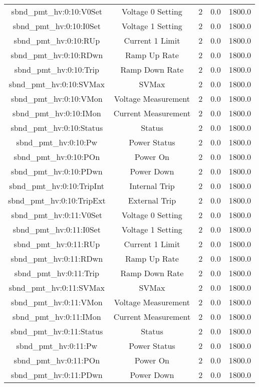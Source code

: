 \begin{center}
\begin{longtable}{c | c c c c }
sbnd\_pmt\_hv:0:10:V0Set & Voltage 0 Setting & 2 & 0.0 & 1800.0\\ 
sbnd\_pmt\_hv:0:10:I0Set & Voltage 1 Setting & 2 & 0.0 & 1800.0\\ 
sbnd\_pmt\_hv:0:10:RUp & Current 1 Limit & 2 & 0.0 & 1800.0\\ 
sbnd\_pmt\_hv:0:10:RDwn & Ramp Up Rate & 2 & 0.0 & 1800.0\\ 
sbnd\_pmt\_hv:0:10:Trip & Ramp Down Rate & 2 & 0.0 & 1800.0\\ 
sbnd\_pmt\_hv:0:10:SVMax & SVMax & 2 & 0.0 & 1800.0\\ 
sbnd\_pmt\_hv:0:10:VMon & Voltage Measurement & 2 & 0.0 & 1800.0\\ 
sbnd\_pmt\_hv:0:10:IMon & Current Measurement & 2 & 0.0 & 1800.0\\ 
sbnd\_pmt\_hv:0:10:Status & Status & 2 & 0.0 & 1800.0\\ 
sbnd\_pmt\_hv:0:10:Pw & Power Status & 2 & 0.0 & 1800.0\\ 
sbnd\_pmt\_hv:0:10:POn & Power On & 2 & 0.0 & 1800.0\\ 
sbnd\_pmt\_hv:0:10:PDwn & Power Down & 2 & 0.0 & 1800.0\\ 
sbnd\_pmt\_hv:0:10:TripInt & Internal Trip & 2 & 0.0 & 1800.0\\ 
sbnd\_pmt\_hv:0:10:TripExt & External Trip & 2 & 0.0 & 1800.0\\ 
sbnd\_pmt\_hv:0:11:V0Set & Voltage 0 Setting & 2 & 0.0 & 1800.0\\ 
sbnd\_pmt\_hv:0:11:I0Set & Voltage 1 Setting & 2 & 0.0 & 1800.0\\ 
sbnd\_pmt\_hv:0:11:RUp & Current 1 Limit & 2 & 0.0 & 1800.0\\ 
sbnd\_pmt\_hv:0:11:RDwn & Ramp Up Rate & 2 & 0.0 & 1800.0\\ 
sbnd\_pmt\_hv:0:11:Trip & Ramp Down Rate & 2 & 0.0 & 1800.0\\ 
sbnd\_pmt\_hv:0:11:SVMax & SVMax & 2 & 0.0 & 1800.0\\ 
sbnd\_pmt\_hv:0:11:VMon & Voltage Measurement & 2 & 0.0 & 1800.0\\ 
sbnd\_pmt\_hv:0:11:IMon & Current Measurement & 2 & 0.0 & 1800.0\\ 
sbnd\_pmt\_hv:0:11:Status & Status & 2 & 0.0 & 1800.0\\ 
sbnd\_pmt\_hv:0:11:Pw & Power Status & 2 & 0.0 & 1800.0\\ 
sbnd\_pmt\_hv:0:11:POn & Power On & 2 & 0.0 & 1800.0\\ 
sbnd\_pmt\_hv:0:11:PDwn & Power Down & 2 & 0.0 & 1800.0\\ 

\end{longtable}
\end{center}
